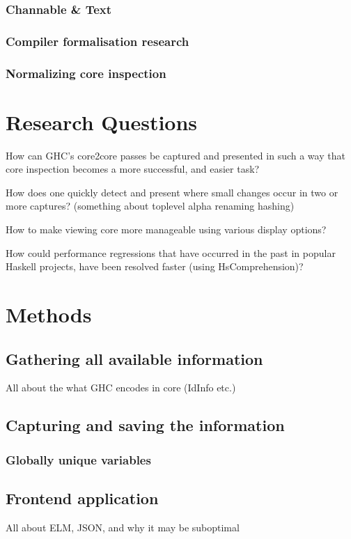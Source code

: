 \documentclass{report}
\begin{document}
\subsection{Channable \& Text}
\subsection{Compiler formalisation research}
\subsection{Normalizing core inspection}

\chapter{Research Questions}

How can GHC’s core2core passes be captured and presented in such a way that core
inspection becomes a more successful, and easier task?

How does one quickly detect and present where small changes occur in two or more captures?
  (something about toplevel alpha renaming hashing)

How to make viewing core more manageable using various display options?

How could performance regressions that have occurred in the past in popular Haskell projects,
have been resolved faster (using HsComprehension)?

\chapter{Methods}

\section{Gathering all available information}
All about the what GHC encodes in core (IdInfo etc.)

\section{Capturing and saving the information}
\subsection{Globally unique variables}

\section{Frontend application}
All about ELM, JSON, and why it may be suboptimal
\end{document}

